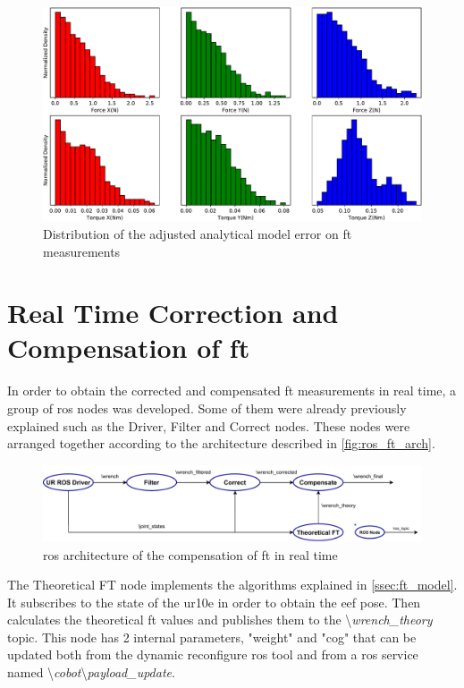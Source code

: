 \begin{figure}[h]
    \centering
    \includegraphics[width=0.8\linewidth]{figs/chp3/ft_sensor_theory_adjust_hist.pdf}
    \caption{Distribution of the adjusted analytical model error on \ac{ft} measurements}
    \label{fig:ft_sensor_theory_adjust_hist}
\end{figure}





\section{Real Time Correction and Compensation of \ac{ft}}

\par In order to obtain the corrected and compensated \ac{ft} measurements in real time, a group of \ac{ros} nodes was developed. Some of them were already previously explained such as the Driver, Filter and Correct nodes. These nodes were arranged together according to the architecture described in \autoref{fig:ros_ft_arch}.

\begin{figure}[h]
    \centering
    \includegraphics[width=\linewidth]{figs/chp3/ros_ft_comp_arch.pdf}
    \caption{\ac{ros} architecture of the compensation of \ac{ft} in real time}
    \label{fig:ros_ft_arch}
\end{figure}

\par The Theoretical FT node implements the algorithms explained in \autoref{ssec:ft_model}. It subscribes to the state of the \ac{ur10e} in order to obtain the \ac{eef} pose. Then calculates the theoretical \ac{ft} values and publishes them to the \textbackslash\textit{wrench\_theory} topic. This node has 2 internal parameters, "weight" and "cog" that can be updated both from the dynamic reconfigure \ac{ros} tool and from a \ac{ros} service named \textbackslash\textit{cobot}\textbackslash\textit{payload\_update}.

